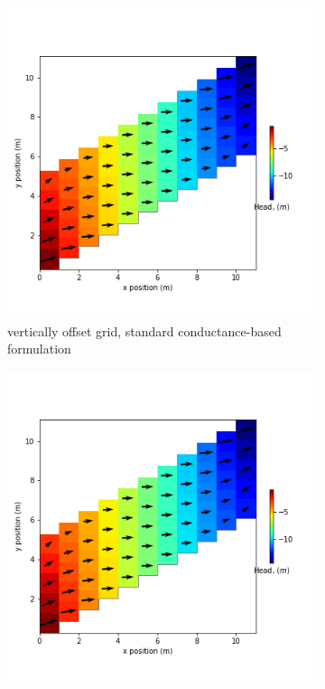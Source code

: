 \documentclass{article}
\begin{document}
\begin{figure}[H]
\centering
\begin{subfigure}{0.4\textwidth}
	\includegraphics[width=\textwidth]{../figures/disu-af-vo-s-head.png}
	\caption{vertically offset grid, standard conductance-based formulation}
	\label{fig:disu-s-nocc-head}
\end{subfigure}
\hfill
\begin{subfigure}{0.4\textwidth}
	\includegraphics[width=\textwidth]{../figures/disu-af-vo-x-head.png}

\end{subfigure}
\end{figure}
\end{document}
